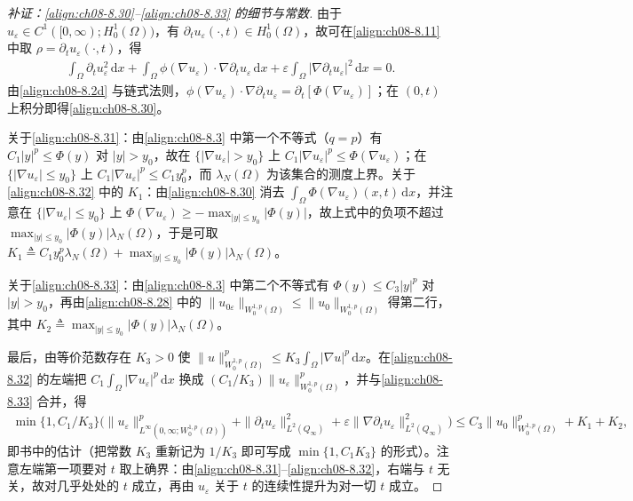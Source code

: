 \documentclass[../../main.tex]{subfiles}%
\begin{document}
\begin{proof}[补证：\eqref{align:ch08-8.30}--\eqref{align:ch08-8.33} 的细节与常数]
由于 $u_\varepsilon\in C^1([0,\infty);H^1_0(\Omega))$，有 $\partial_tu_\varepsilon(\cdot,t)\in H^1_0(\Omega)$，故可在\eqref{align:ch08-8.11} 中取 $\rho=\partial_tu_\varepsilon(\cdot,t)$，得
\begin{align*}
\int_\Omega\partial_tu_\varepsilon^2\,\mathrm{d}x
+\int_\Omega\phi(\nabla u_\varepsilon)\cdot\nabla\partial_tu_\varepsilon\,\mathrm{d}x
+\varepsilon\int_\Omega|\nabla\partial_tu_\varepsilon|^2\,\mathrm{d}x=0.
\end{align*}
由\eqref{align:ch08-8.2d} 与链式法则，$\phi(\nabla u_\varepsilon)\cdot\nabla\partial_tu_\varepsilon=\partial_t[\Phi(\nabla u_\varepsilon)]$；在 $(0,t)$ 上积分即得\eqref{align:ch08-8.30}。

关于\eqref{align:ch08-8.31}：由\eqref{align:ch08-8.3} 中第一个不等式（$q=p$）有 $C_1|y|^p\leqslant\Phi(y)$ 对 $|y|>y_0$，故在 $\{|\nabla u_\varepsilon|>y_0\}$ 上 $C_1|\nabla u_\varepsilon|^p\leqslant\Phi(\nabla u_\varepsilon)$；在 $\{|\nabla u_\varepsilon|\leqslant y_0\}$ 上 $C_1|\nabla u_\varepsilon|^p\leqslant C_1y_0^p$，而 $\lambda_N(\Omega)$ 为该集合的测度上界。关于\eqref{align:ch08-8.32} 中的 $K_1$：由\eqref{align:ch08-8.30} 消去 $\int_\Omega\Phi(\nabla u_\varepsilon)(x,t)\,\mathrm{d}x$，并注意在 $\{|\nabla u_\varepsilon|\leqslant y_0\}$ 上 $\Phi(\nabla u_\varepsilon)\geqslant-\max_{|y|\leqslant y_0}|\Phi(y)|$，故上式中的负项不超过 $\max_{|y|\leqslant y_0}|\Phi(y)|\lambda_N(\Omega)$，于是可取 $K_1\triangleq C_1y_0^p\lambda_N(\Omega)+\max_{|y|\leqslant y_0}|\Phi(y)|\lambda_N(\Omega)$。

关于\eqref{align:ch08-8.33}：由\eqref{align:ch08-8.3} 中第二个不等式有 $\Phi(y)\leqslant C_3|y|^p$ 对 $|y|>y_0$，再由\eqref{align:ch08-8.28} 中的 $\|u_{0\varepsilon}\|_{W^{1,p}_0(\Omega)}\leqslant\|u_0\|_{W^{1,p}_0(\Omega)}$ 得第二行，其中 $K_2\triangleq\max_{|y|\leqslant y_0}|\Phi(y)|\lambda_N(\Omega)$。

最后，由等价范数存在 $K_3>0$ 使 $\|u\|^p_{W^{1,p}_0(\Omega)}\leqslant K_3\int_\Omega|\nabla u|^p\,\mathrm{d}x$。在\eqref{align:ch08-8.32} 的左端把 $C_1\int_\Omega|\nabla u_\varepsilon|^p\,\mathrm{d}x$ 换成 $(C_1/K_3)\|u_\varepsilon\|^p_{W^{1,p}_0(\Omega)}$，并与\eqref{align:ch08-8.33} 合并，得
\begin{align*}
\min\{1,C_1/K_3\}\Big(\|u_\varepsilon\|^p_{L^\infty(0,\infty;W^{1,p}_0(\Omega))}
+\|\partial_tu_\varepsilon\|^2_{L^2(Q_\infty)}
+\varepsilon\|\nabla\partial_tu_\varepsilon\|^2_{L^2(Q_\infty)}\Big)
\leqslant C_3\|u_0\|^p_{W^{1,p}_0(\Omega)}+K_1+K_2,
\end{align*}
即书中的估计（把常数 $K_3$ 重新记为 $1/K_3$ 即可写成 $\min\{1,C_1K_3\}$ 的形式）。注意左端第一项要对 $t$ 取上确界：由\eqref{align:ch08-8.31}--\eqref{align:ch08-8.32}，右端与 $t$ 无关，故对几乎处处的 $t$ 成立，再由 $u_\varepsilon$ 关于 $t$ 的连续性提升为对一切 $t$ 成立。
\end{proof}
\end{document}

